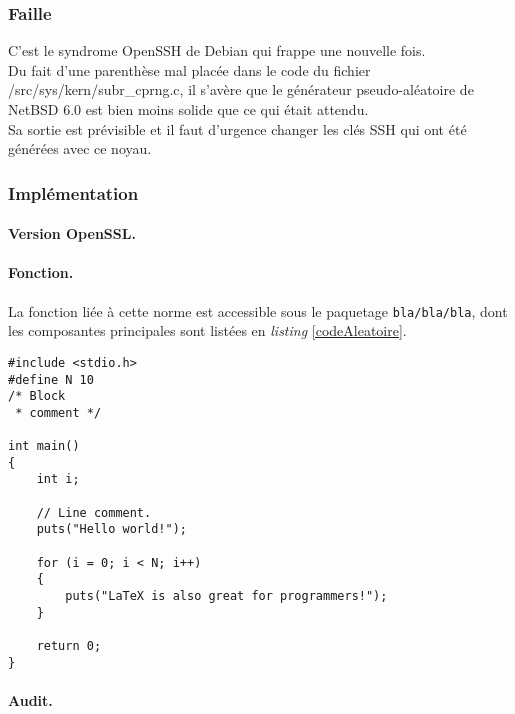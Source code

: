 	\subsubsection{Faille}
	
	C'est le syndrome OpenSSH de Debian qui frappe une nouvelle fois.\\
	Du fait d'une parenthèse mal placée dans le code du fichier 
	/src/sys/kern/subr\_cprng.c, il s'avère que le générateur pseudo-aléatoire 
	de NetBSD 6.0 est bien moins solide que ce qui était attendu.\\
	Sa sortie est prévisible et il faut d'urgence changer les clés SSH qui ont été générées avec ce noyau.\\
	
	\subsubsection{Implémentation}
		
		\paragraph{Version OpenSSL.\\}
		
		\paragraph{Fonction.\\}
		La fonction liée à cette norme est accessible sous le paquetage \texttt{bla/bla/bla}, dont les composantes principales sont listées en \textit{listing} \ref{codeAleatoire}.
		
		
		\begin{lstlisting}[style=customc,caption=codeAleatoire.c, label=codeAleatoire]
#include <stdio.h>
#define N 10
/* Block
 * comment */
 
int main()
{
    int i;
 
    // Line comment.
    puts("Hello world!");
 
    for (i = 0; i < N; i++)
    {
        puts("LaTeX is also great for programmers!");
    }
 
    return 0;
}
		\end{lstlisting}
		
		
		
		\paragraph{Audit.\\}



